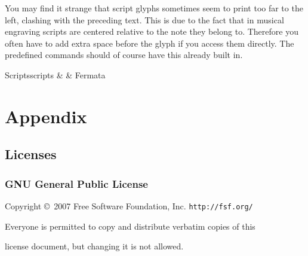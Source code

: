 \documentclass{article}
\begin{document}
You may find it strange that script glyphs sometimes seem to print too far to the left, clashing with the preceding text.
This is due to the fact that in musical engraving scripts are centered relative to the note they belong to.
Therefore you often have to add extra space before the glyph if you access them directly.
The predefined commands should of course have this already built in.

\begin{reftable}{Scripts}{scripts}
\fermata &  & Fermata\\
\end{reftable}

\pagebreak
\appendix
\small
\section{Appendix}
\subsection{Licenses}

\subsubsection{GNU General Public License}
\label{subsubsec:gpl}

\begin{center}
{\parindent 0in

Copyright \copyright\  2007 Free Software Foundation, Inc. \texttt{http://fsf.org/}

\bigskip
Everyone is permitted to copy and distribute verbatim copies of this

license document, but changing it is not allowed.}

\end{center}
\end{document}
